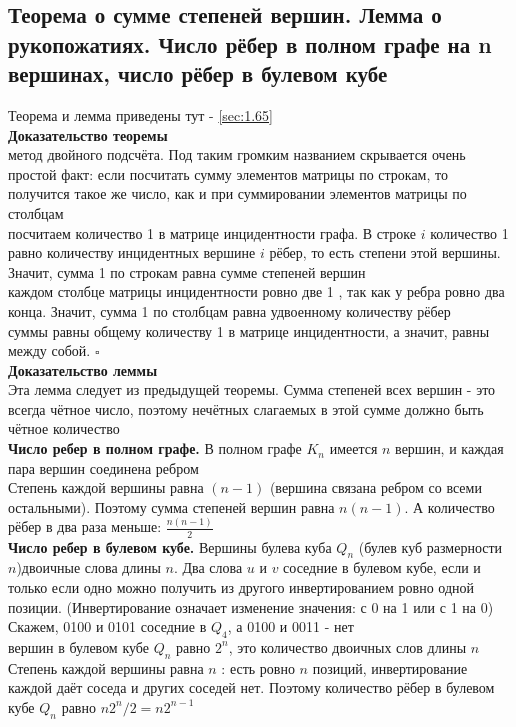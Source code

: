 \documentclass[a4paper]{article}
\newcommand{\qed}{\hfill$\square$}
\begin{document}
\subsection{Теорема о сумме степеней вершин. Лемма о рукопожатиях. Число рёбер в полном графе на n вершинах, число рёбер в булевом кубе}
Теорема и лемма приведены тут - \ref{sec:1.65}\\[2mm]
\textbf{Доказательство теоремы}\\[2mm]
 метод двойного подсчёта. Под таким громким названием скрывается очень простой факт: если посчитать сумму элементов матрицы по строкам, то получится такое же число, как и при суммировании элементов матрицы по столбцам\\[2mm]
 посчитаем количество 1 в матрице инцидентности графа. В строке $i$ количество 1 равно количеству инцидентных вершине $i$ рёбер, то есть степени этой вершины. Значит, сумма 1 по строкам равна сумме степеней вершин\\[2mm]
 каждом столбце матрицы инцидентности ровно две 1 , так как у ребра ровно два конца. Значит, сумма 1 по столбцам равна удвоенному количеству рёбер\\[2mm]
 суммы равны общему количеству 1 в матрице инцидентности, а значит, равны между собой. \qed\\[7mm]
\textbf{Доказательство леммы}\\[2mm]
\indent Эта лемма следует из предыдущей теоремы. Сумма степеней всех вершин - это всегда чётное число, поэтому нечётных слагаемых в этой сумме должно быть чётное количество\\[2mm]
\textbf{Число ребер в полном графе.} В полном графе $K_{n}$ имеется $n$ вершин, и каждая пара вершин соединена ребром\\[2mm]
\indent Степень каждой вершины равна $(n-1)$ (вершина связана ребром со всеми остальными). Поэтому сумма степеней вершин равна $n(n-1)$. А количество рёбер в два раза меньше: $\frac{n(n-1)}{2}$\\[2mm]
\textbf{Число ребер в булевом кубе.} Вершины булева куба $Q_{n}$ (булев куб размерности $n$)двоичные слова длины $n$. Два слова $u$ и $v$ соседние в булевом кубе, если и только если одно можно получить из другого инвертированием ровно одной позиции. (Инвертирование означает изменение значения: с 0 на 1 или с 1 на 0)\\[2mm]
\indent Скажем, 0100 и 0101 соседние в $Q_{4}$, а 0100 и 0011 - нет\\[2mm]
 вершин в булевом кубе $Q_{n}$ равно $2^{n}$, это количество двоичных слов длины $n$\\[2mm]
\indent Степень каждой вершины равна $n$ : есть ровно $n$ позиций, инвертирование каждой даёт соседа и других соседей нет. Поэтому количество рёбер в булевом кубе $Q_{n}$ равно $n 2^{n} / 2=n 2^{n-1}$
\end{document}
